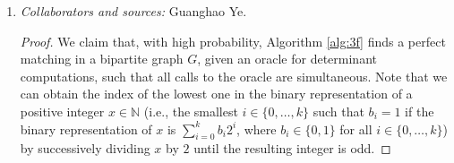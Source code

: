 \documentclass[letterpaper, reqno,11pt]{article}
\newcommand{\NN}{\mathbb{N}}
\DeclareMathOperator{\sign}{sign}
\begin{document}
\begin{enumerate}
\begin{enumerate}
\begin{proof}
\begin{itemize}[itemsep=0pt]
\begin{align*}
        \end{align*}
        Since $\det A' \neq 0$ and since weights are non-negative integers, then
        \begin{equation} \label{eq:3e-odd}
          \left|\sign\left(\sigma_1\right) + \sum_{i = 2}^\ell \sign\left(\sigma_i\right) 2^{w\left(M_{\sigma_i}\right) - w\left(M_{\sigma_1}\right)}\right|
        \end{equation}
        is at least $1$. Suppose that the binary representation of \eqref{eq:3e-odd} is $\sum_{i = 0}^{k'} \beta_i 2^i$, where $\beta_i \in \{ 0, 1 \}$ for all $i \in \{ 0, \ldots, k' \}$, and there exists $i \in \{ 0, \ldots, k' \}$ with $\beta_i = 1$. Hence,
        $$ \left|\det A'\right| = 2^{w'} \left(\sum_{i = 0}^{k'} \beta_i 2^i\right) = \sum_{i = 0}^{k'} \beta_i 2^{w' + i}. $$
        By the uniqueness of binary representations, we have $j^* \geq w' > w^* = i^*$.
      \end{itemize}
      
      In other words, we have shown that an edge $e \in E$ is not contained in the (unique) minimum weight perfect matching of $G$ if and only if $\det A' \neq 0$ and $i^* = j^*$ (where $j^*$ is defined as in Algorithm \ref{alg:specific-edge}). This justifies Algorithm \ref{alg:specific-edge}, completing the proof.
    \end{proof}

    \clearpage

    \item \noindent\emph{Collaborators and sources:} Guanghao Ye.

    \bigskip

    \begin{proof}
      We claim that, with high probability, Algorithm \ref{alg:3f} finds a perfect matching in a bipartite graph $G$, given an oracle for determinant computations, such that all calls to the oracle are simultaneous. Note that we can obtain the index of the lowest one in the binary representation of a positive integer $x \in \NN$ (i.e., the smallest $i \in \{ 0, \ldots, k \}$ such that $b_i = 1$ if the binary representation of $x$ is $\sum_{i = 0}^k b_i 2^i$, where $b_i \in \{ 0, 1 \}$ for all $i \in \{ 0, \ldots, k \}$) by successively dividing $x$ by $2$ until the resulting integer is odd.


\end{proof}
\end{enumerate}
\end{enumerate}
\end{document}
